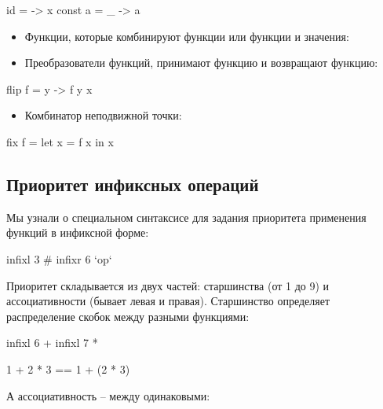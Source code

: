 \begin{code}
id      = \x -> x
const a = \_ -> a
\end{code}

\begin{itemize}
\item
  Функции, которые комбинируют функции или функции и значения:
\end{itemize}



\begin{itemize}
\item
  Преобразователи функций, принимают функцию и возвращают функцию:
\end{itemize}


\begin{code}
flip f = \x y -> f y x
\end{code}

\begin{itemize}
\item
  Комбинатор неподвижной точки:
\end{itemize}


\begin{code}
fix f = let x = f x
        in  x
\end{code}

\subsection{Приоритет инфиксных операций}

Мы узнали о специальном синтаксисе для задания приоритета применения
функций в инфиксной форме:


\begin{code}
infixl 3 #
infixr 6 `op`
\end{code}

Приоритет складывается из двух частей: старшинства (от 1 до 9) и
ассоциативности (бывает левая и правая). Старшинство определяет
распределение скобок между разными функциями:


\begin{code}
infixl 6 +
infixl 7 *

1 + 2 * 3 == 1 + (2 * 3)
\end{code}

А ассоциативность -- между одинаковыми:


